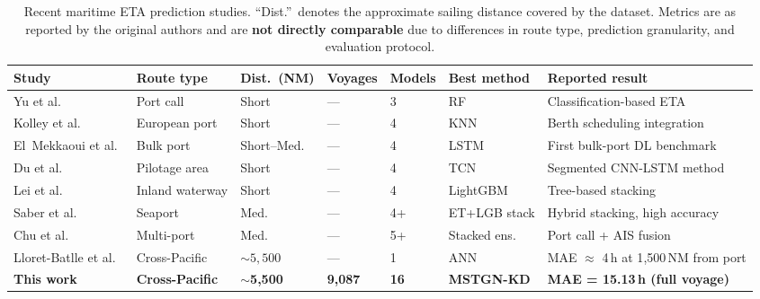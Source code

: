 \documentclass[sigconf,anonymous]{acmart}%
\begin{document}
\begin{table}[t]
    \centering
    \caption{Recent maritime ETA prediction studies. ``Dist.''~denotes the approximate sailing distance covered by the dataset. Metrics are as reported by the original authors and are \textbf{not directly comparable} due to differences in route type, prediction granularity, and evaluation protocol.}
    \label{tab:lit_comparison}
    \footnotesize
    \setlength{\tabcolsep}{3pt}
    \renewcommand{\arraystretch}{1.15}
    \begin{tabular}{P{2.5cm} P{1.5cm} P{1.7cm} P{1.5cm} P{1.2cm} P{2.0cm} P{3.8cm}}
        \toprule
        \textbf{Study} & \textbf{Route type} & \textbf{Dist.\ (NM)} & \textbf{Voyages} & \textbf{Models} & \textbf{Best method} & \textbf{Reported result} \\
        \midrule
        Yu et al.~\cite{yuShipArrivalPrediction2018} & Port call & Short & --- & 3 & RF & Classification-based ETA \\
        Kolley et al.~\cite{kolleyRobustBerthScheduling2022} & European port & Short & --- & 4 & KNN & Berth scheduling integration \\
        El~Mekkaoui et al.~\cite{elmekkaouiDeepLearningModels2022} & Bulk port & Short--Med. & --- & 4 & LSTM & First bulk-port DL benchmark \\
        Du et al.~\cite{duSegmentedETAPrediction2025} & Pilotage area & Short & --- & 4 & TCN & Segmented CNN-LSTM method \\
        Lei et al.~\cite{leiPredictingVesselArrival2024} & Inland waterway & Short & --- & 4 & LightGBM & Tree-based stacking \\
        Saber et al.~\cite{saberHighaccuracyPredictionVessels2025} & Seaport & Med. & --- & 4+ & ET+LGB stack & Hybrid stacking, high accuracy \\
        Chu et al.~\cite{chuVesselArrivalTime2025} & Multi-port & Med. & --- & 5+ & Stacked ens. & Port call + AIS fusion \\
        Lloret-Batlle et al.~\cite{lloretbatlle2025} & Cross-Pacific & ${\sim}5{,}500$ & --- & 1 & ANN & MAE $\approx$ 4\,h at 1{,}500\,NM from port \\
        \midrule
        \textbf{This work} & \textbf{Cross-Pacific} & $\boldsymbol{\sim}$\textbf{5,500} & \textbf{9,087} & \textbf{16} & \textbf{MSTGN-KD} & \textbf{MAE = 15.13\,h (full voyage)} \\
        \bottomrule
    \end{tabular}
\end{table}
\end{document}

